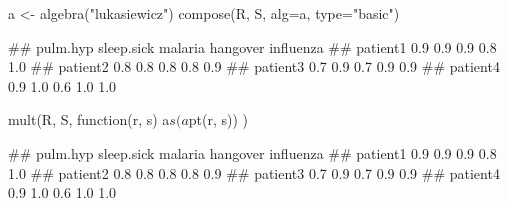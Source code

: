 \documentclass{article}\usepackage[]{graphicx}\usepackage[]{color}
\begin{document}
\begin{Schunk}
% --begin: "comp.basic"
\begin{Sinput}
a <- algebra("lukasiewicz")
compose(R, S, alg=a, type="basic")
\end{Sinput}
\begin{Soutput}
##          pulm.hyp sleep.sick malaria hangover influenza
## patient1      0.9        0.9     0.9      0.8       1.0
## patient2      0.8        0.8     0.8      0.8       0.9
## patient3      0.7        0.9     0.7      0.9       0.9
## patient4      0.9        1.0     0.6      1.0       1.0
\end{Soutput}
%
% --end: "comp.basic"
\end{Schunk}

\begin{Schunk}
% --begin: "comp.mult"
\begin{Sinput}
mult(R, S, function(r, s) {
  a$s(a$pt(r, s))
})
\end{Sinput}
\begin{Soutput}
##          pulm.hyp sleep.sick malaria hangover influenza
## patient1      0.9        0.9     0.9      0.8       1.0
## patient2      0.8        0.8     0.8      0.8       0.9
## patient3      0.7        0.9     0.7      0.9       0.9
## patient4      0.9        1.0     0.6      1.0       1.0
\end{Soutput}
%
% --end: "comp.mult"
\end{Schunk}
\end{document}
